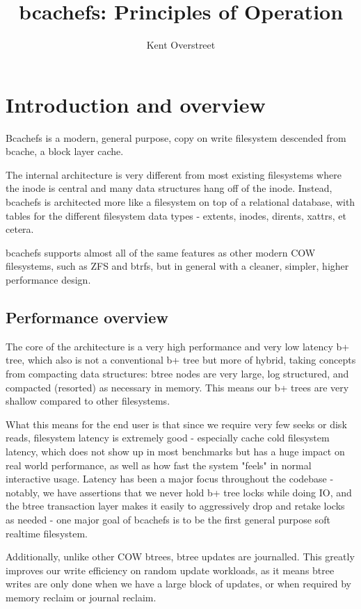 \documentclass{article}
\title{bcachefs: Principles of Operation}
\author{Kent Overstreet}
\date{}
\begin{document}
\maketitle
\tableofcontents

\section{Introduction and overview}

Bcachefs is a modern, general purpose, copy on write filesystem descended from
bcache, a block layer cache.

The internal architecture is very different from most existing filesystems where
the inode is central and many data structures hang off of the inode. Instead,
bcachefs is architected more like a filesystem on top of a relational database,
with tables for the different filesystem data types - extents, inodes, dirents,
xattrs, et cetera.

bcachefs supports almost all of the same features as other modern COW
filesystems, such as ZFS and btrfs, but in general with a cleaner, simpler,
higher performance design.

\subsection{Performance overview}

The core of the architecture is a very high performance and very low latency b+
tree, which also is not a conventional b+ tree but more of hybrid, taking
concepts from compacting data structures: btree nodes are very large, log
structured, and compacted (resorted) as necessary in memory. This means our b+
trees are very shallow compared to other filesystems.

What this means for the end user is that since we require very few seeks or disk
reads, filesystem latency is extremely good - especially cache cold filesystem
latency, which does not show up in most benchmarks but has a huge impact on real
world performance, as well as how fast the system "feels" in normal interactive
usage. Latency has been a major focus throughout the codebase - notably, we have
assertions that we never hold b+ tree locks while doing IO, and the btree
transaction layer makes it easily to aggressively drop and retake locks as
needed - one major goal of bcachefs is to be the first general purpose soft
realtime filesystem.

Additionally, unlike other COW btrees, btree updates are journalled. This
greatly improves our write efficiency on random update workloads, as it means
btree writes are only done when we have a large block of updates, or when
required by memory reclaim or journal reclaim.
\end{document}
